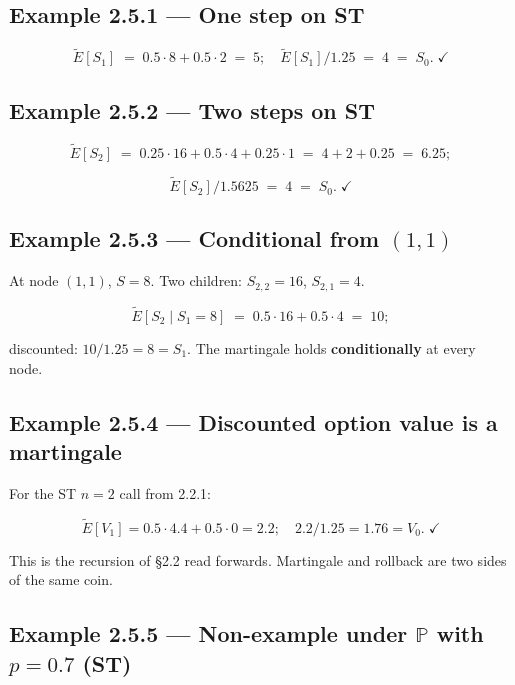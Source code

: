 \documentclass[
  10pt,
  twoside]{book}
\begin{document}
\subsection{Example 2.5.1 --- One step on
ST}\label{example-2.5.1-one-step-on-st}

\[
\tilde E[S_1] \;=\; 0.5\cdot 8 + 0.5\cdot 2 \;=\; 5;\quad \tilde E[S_1]/1.25 \;=\; 4 \;=\; S_0.\;\checkmark
\]

\subsection{Example 2.5.2 --- Two steps on
ST}\label{example-2.5.2-two-steps-on-st}

\[
\tilde E[S_2] \;=\; 0.25\cdot 16 + 0.5\cdot 4 + 0.25\cdot 1 \;=\; 4 + 2 + 0.25 \;=\; 6.25;
\]

\[
\tilde E[S_2]/1.5625 \;=\; 4 \;=\; S_0.\;\checkmark
\]

\subsection{\texorpdfstring{Example 2.5.3 --- Conditional from
\((1,1)\)}{Example 2.5.3 --- Conditional from (1,1)}}\label{example-2.5.3-conditional-from-11}

At node \((1,1)\), \(S=8\). Two children: \(S_{2,2}=16\), \(S_{2,1}=4\).

\[
\tilde E[S_2\mid S_1=8] \;=\; 0.5\cdot 16 + 0.5\cdot 4 \;=\; 10;
\]

discounted: \(10/1.25 = 8 = S_1\). The martingale holds
\textbf{conditionally} at every node.

\subsection{Example 2.5.4 --- Discounted option value is a
martingale}\label{example-2.5.4-discounted-option-value-is-a-martingale}

For the ST \(n=2\) call from 2.2.1:

\[
\tilde E[V_1] = 0.5\cdot 4.4 + 0.5\cdot 0 = 2.2;\quad 2.2/1.25 = 1.76 = V_0.\;\checkmark
\]

This is the recursion of §2.2 read forwards. Martingale and rollback are
two sides of the same coin.

\subsection{\texorpdfstring{Example 2.5.5 --- Non-example under
\(\mathbb P\) with \(p=0.7\)
(ST)}{Example 2.5.5 --- Non-example under \textbackslash mathbb P with p=0.7 (ST)}}\label{example-2.5.5-non-example-under-mathbb-p-with-p0.7-st}
\end{document}
